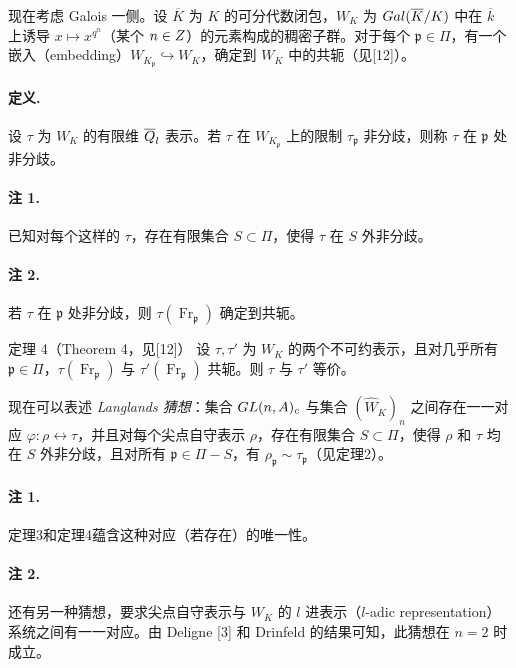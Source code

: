 现在考虑 Galois 一侧。设 $\overline K$ 为 $K$ 的可分代数闭包，$W_K$ 为 $Gal(\overline K/K)$ 中在 $\overline k$ 上诱导 $x\mapsto x^{q^n}$（某个 $n\in Z$）的元素构成的稠密子群。对于每个 $\mathfrak p\in\Pi$，有一个嵌入（embedding）$W_{K_{\mathfrak p}}\hookrightarrow W_K$，确定到 $W_K$ 中的共轭（见[12]）。

\paragraph*{定义.} 设 $\tau$ 为 $W_K$ 的有限维 $\overline{Q}_l$ 表示。若 $\tau$ 在 $W_{K_{\mathfrak p}}$ 上的限制 $\tau_{\mathfrak p}$ 非分歧，则称 $\tau$ 在 $\mathfrak p$ 处非分歧。

\paragraph*{注 1.} 已知对每个这样的 $\tau$，存在有限集合 $S\subset\Pi$，使得 $\tau$ 在 $S$ 外非分歧。
\paragraph*{注 2.} 若 $\tau$ 在 $\mathfrak p$ 处非分歧，则 $\tau(\operatorname{Fr}_{\mathfrak p})$ 确定到共轭。

\begin{originaltheorem}{定理 4（Theorem 4，见[12]）}
设 $\tau,\tau'$ 为 $W_K$ 的两个不可约表示，且对几乎所有 $\mathfrak p\in\Pi$，$\tau(\operatorname{Fr}_{\mathfrak p})$ 与 $\tau'(\operatorname{Fr}_{\mathfrak p})$ 共轭。则 $\tau$ 与 $\tau'$ 等价。
\end{originaltheorem}

现在可以表述 \emph{Langlands 猜想}：集合 $GL(n,A)_c$ 与集合 $(\widehat W_K)_n$ 之间存在一一对应 $\varphi:\rho\leftrightarrow\tau$，并且对每个尖点自守表示 $\rho$，存在有限集合 $S\subset\Pi$，使得 $\rho$ 和 $\tau$ 均在 $S$ 外非分歧，且对所有 $\mathfrak p\in\Pi-S$，有 $\rho_{\mathfrak p}\sim\tau_{\mathfrak p}$（见定理2）。

\paragraph*{注 1.} 定理3和定理4蕴含这种对应（若存在）的唯一性。
\paragraph*{注 2.} 还有另一种猜想，要求尖点自守表示与 $W_K$ 的 $l$ 进表示（$l$-adic representation）系统之间有一一对应。由 Deligne [3] 和 Drinfeld 的结果可知，此猜想在 $n=2$ 时成立。


